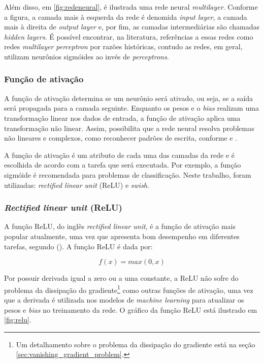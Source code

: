 Além disso, em \ref{fig:redeneural}, é ilustrada uma rede neural \textit{multilayer}.
Conforme a figura, a camada mais à esquerda da rede é 
denomida \textit{input layer}, a camada mais à direita de \textit{output layer}
e, por fim, as camadas intermediárias são chamadas \textit{hidden layers}.
É possível encontrar, na literatura, referências a essas redes como redes 
\textit{multilayer perceptron} por razões históricas, contudo as redes, em geral,
utilizam neurônios sigmóides ao invés de \textit{perceptrons}.

\subsubsection{Função de ativação}
\label{sec:funcao_ativacao}

A função de ativação determina se um neurônio será ativado, ou seja, 
se a saída será propagada para a camada seguinte. Enquanto os pesos 
e o \textit{bias} realizam uma transformação linear nos dados 
de entrada, a função de ativação aplica uma transformação não
linear. Assim, possibilita que a rede neural resolva
problemas não lineares e complexos, como reconhecer padrões de 
escrita, conforme \cite{deeplearningbook} e \cite{zhang2021dive}. 

A função de ativação é um atributo de cada uma das camadas 
da rede e é escolhida de acordo com a tarefa que será 
executada. Por exemplo, a função sigmóide é recomendada
 para problemas de classificação. Neste trabalho, 
foram utilizadas: \textit{rectified linear unit} (ReLU) e \textit{swish}.

\subsubsection{\textit{Rectified linear unit} (ReLU)}

A função ReLU, do inglês \textit{rectified linear unit}, é a
função de ativação mais popular atualmente, uma vez que apresenta bom desempenho 
em diferentes tarefas, segundo (\cite{dl-oreilly}). A função ReLU é dada por:

\begin{equation}
  f(x) = max(0,x)
\end{equation}

Por possuir derivada igual a zero ou a uma constante, a ReLU não sofre do problema da dissipação do gradiente\footnote{Um 
detalhamento sobre o problema da dissipação do gradiente está na seção \ref{sec:vanishing_gradient_problem}.} como
outras funções de ativação, 
uma vez que a derivada é utilizada nos modelos de \textit{machine learning}
para atualizar os pesos e \textit{bias} no treinamento da rede.
O gráfico da função ReLU está ilustrado em \ref{fig:relu}.

